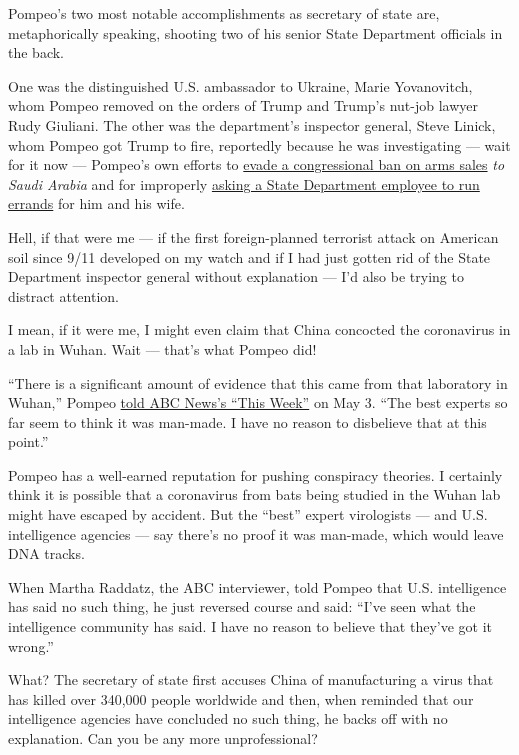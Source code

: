 Pompeo's two most notable accomplishments as secretary of state are,
metaphorically speaking, shooting two of his senior State Department
officials in the back.

One was the distinguished U.S. ambassador to Ukraine, Marie Yovanovitch,
whom Pompeo removed on the orders of Trump and Trump's nut-job lawyer
Rudy Giuliani. The other was the department's inspector general, Steve
Linick, whom Pompeo got Trump to fire, reportedly because he was
investigating --- wait for it now --- Pompeo's own efforts to
\href{https://www.nytimes3xbfgragh.onion/2020/05/16/us/arms-deals-raytheon-yemen.html}{evade
a congressional ban on arms sales} \emph{to Saudi Arabia} and for
improperly
\href{https://www.cnn.com/2019/07/01/politics/pompeo-democrats-whistleblower-claims/index.html}{asking
a State Department employee to run errands} for him and his wife.

Hell, if that were me --- if the first foreign-planned terrorist attack
on American soil since 9/11 developed on my watch and if I had just
gotten rid of the State Department inspector general without explanation
--- I'd also be trying to distract attention.

I mean, if it were me, I might even claim that China concocted the
coronavirus in a lab in Wuhan. Wait --- that's what Pompeo did!

``There is a significant amount of evidence that this came from that
laboratory in Wuhan,'' Pompeo
\href{https://www.state.gov/secretary-michael-r-pompeo-with-martha-raddatz-of-abcs-this-week-with-george-stephanopoulos/}{told
ABC News's ``This Week''} on May 3. ``The best experts so far seem to
think it was man-made. I have no reason to disbelieve that at this
point.''

Pompeo has a well-earned reputation for pushing conspiracy theories. I
certainly think it is possible that a coronavirus from bats being
studied in the Wuhan lab might have escaped by accident. But the
``best'' expert virologists --- and U.S. intelligence agencies --- say
there's no proof it was man-made, which would leave DNA tracks.

When Martha Raddatz, the ABC interviewer, told Pompeo that U.S.
intelligence has said no such thing, he just reversed course and said:
``I've seen what the intelligence community has said. I have no reason
to believe that they've got it wrong.''

What? The secretary of state first accuses China of manufacturing a
virus that has killed over 340,000 people worldwide and then, when
reminded that our intelligence agencies have concluded no such thing, he
backs off with no explanation. Can you be any more unprofessional?


